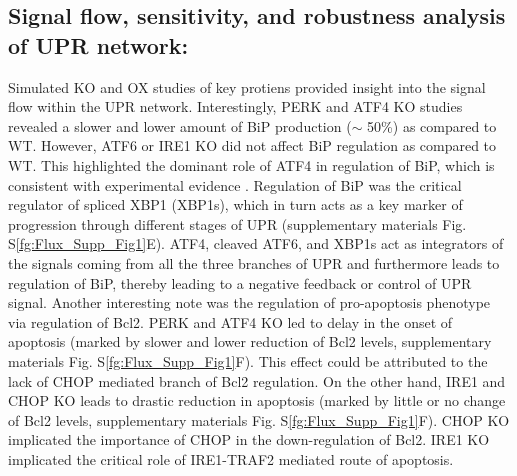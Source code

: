 \documentclass[fleqn,10pt]{wlscirep}
\begin{document}
\subsection*{Signal flow, sensitivity, and robustness analysis of UPR network:}
Simulated KO and OX studies of key protiens provided insight into the signal flow within the UPR network. Interestingly, PERK and ATF4 KO studies revealed a slower and lower amount of BiP production ($\sim$ 50\%) as compared to WT. However, ATF6 or IRE1 KO did not affect BiP regulation as compared to WT. This highlighted the dominant role of ATF4 in regulation of BiP, which is consistent with experimental evidence \cite{ma2003delineation}. Regulation of BiP was the critical regulator of spliced XBP1 (XBP1s), which in turn acts as a key marker of progression through different stages of UPR (supplementary materials Fig. S\ref{fg:Flux_Supp_Fig1}E). ATF4, cleaved ATF6, and XBP1s act as integrators of the signals coming from all the three branches of UPR and furthermore leads to regulation of BiP, thereby leading to a negative feedback or control of UPR signal. Another interesting note was the regulation of pro-apoptosis phenotype via regulation of Bcl2. PERK and ATF4 KO led to delay in the onset of apoptosis (marked by slower and lower reduction of Bcl2 levels, supplementary materials Fig. S\ref{fg:Flux_Supp_Fig1}F). This effect could be attributed to the lack of CHOP mediated branch of Bcl2 regulation. On the other hand, IRE1 and CHOP KO leads to drastic reduction in apoptosis (marked by little or no change of Bcl2 levels, supplementary materials Fig. S\ref{fg:Flux_Supp_Fig1}F). CHOP KO implicated the importance of CHOP in the down-regulation of Bcl2. IRE1 KO implicated the critical role of IRE1-TRAF2 mediated route of apoptosis.
\end{document}
